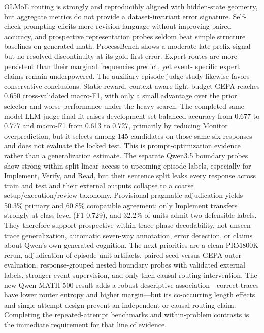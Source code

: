 \documentclass[manuscript,screen,review]{jair}
\begin{document}
OLMoE routing is strongly and reproducibly aligned with hidden-state geometry,
but aggregate metrics do not provide a dataset-invariant error signature.
Self-check prompting elicits more revision language without improving paired
accuracy, and prospective representation probes seldom beat simple structure
baselines on generated math.  ProcessBench shows a moderate late-prefix
signal but no resolved discontinuity at its gold first error.  Expert routes
are more persistent than their marginal frequencies predict, yet event-
specific expert claims remain underpowered.  The auxiliary episode-judge study
likewise favors conservative conclusions.  Static-reward, context-aware
light-budget GEPA reaches 0.650 cross-validated macro-F1, with only a small
advantage over the prior selector and worse performance under the heavy search.
The completed same-model LLM-judge final fit raises development-set balanced
accuracy from 0.677 to 0.777 and macro-F1 from 0.613 to 0.727, primarily by
reducing Monitor overprediction, but it selects among 145 candidates on those
same six responses and does not evaluate the locked test.  This is
prompt-optimization evidence rather than a generalization estimate.  The separate
Qwen3.5 boundary probes
show strong within-split linear access to upcoming episode labels, especially
for Implement, Verify, and Read, but their sentence split leaks every response
across train and test and their external outputs collapse to a coarse
setup/execution/review taxonomy.  Provisional pragmatic adjudication yields
50.3\% primary and 60.8\% compatible agreement; only Implement transfers
strongly at class level (F1 0.729), and 32.2\% of units admit two defensible
labels.  They therefore support prospective
within-trace phase decodability, not unseen-trace generalization, automatic
seven-way annotation, error detection, or claims about Qwen's own generated
cognition.  The next priorities are a clean PRM800K rerun, adjudication of
episode-unit artifacts, paired seed-versus-GEPA outer evaluation,
response-grouped nested boundary probes with validated external labels,
stronger event supervision, and only then causal routing intervention.
The new Qwen MATH-500 result adds a robust descriptive association---correct
traces have lower router entropy and higher margin---but its co-occurring
length effects and single-attempt design prevent an independent or causal
routing claim.  Completing the repeated-attempt benchmarks and within-problem
contrasts is the immediate requirement for that line of evidence.

\appendix
\end{document}

